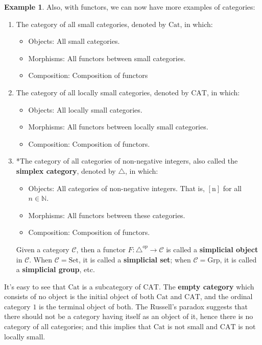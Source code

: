 \documentclass{article}
\theoremstyle{definition}
\theoremstyle{definition}
\newtheorem{example}{Example}[section]
\theoremstyle{remark}
\begin{document}
	\begin{example}
	Also, with functors, we can now have more examples of categories:
		\begin{enumerate}[label=(\roman*)]
			\item The category of all small categories, denoted by $\mathrm{Cat}$, in which:
				\begin{itemize}
					\item Objects: All small categories.
					\item Morphisms: All functors between small categories.
					\item Composition: Composition of functors
				\end{itemize}
			\item The category of all locally small categories, denoted by $\mathrm{CAT}$, in which:
				\begin{itemize}
					\item Objects: All locally small categories.
					\item Morphisms: All functors between locally small categories.
					\item Composition: Composition of functors.
				\end{itemize}
				
			\item *The category of all categories of non-negative integers, also called the \textbf{simplex category}, denoted by $\triangle$, in which:
				\begin{itemize}
					\item Objects: All categories of non-negative integers. That is, $[\mathrm{n}]$ for all $n\in \mathbb{N}$.
					\item Morphisms: All functors between these categories.
					\item Composition: Composition of functors.
				\end{itemize}
		Given a category $\mathcal{C}$, then a functor $F:\triangle^{op}\to \mathcal{C}$ is called a \textbf{simplicial object} in $\mathcal{C}$. When $\mathcal{C}=\mathrm{Set}$, it is called a \textbf{simplicial set}; when $\mathcal{C}=\mathrm{Grp}$, it is called a \textbf{simplicial group}, etc.
		\end{enumerate}
	\end{example}
	It's easy to see that $\mathrm{Cat}$ is a subcategory of $\mathrm{CAT}$. The \textbf{empty category} which consists of no object is the initial object of both $\mathrm{Cat}$ and $\mathrm{CAT}$, and the ordinal category $\mathrm{1}$ is the terminal object of both. The Russell's paradox suggests that there should not be a category having itself as an object of it, hence there is no category of all categories; and this implies that $\mathrm{Cat}$ is not small and $\mathrm{CAT}$ is not locally small.\par
\end{document}

